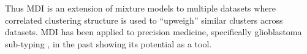 \documentclass[11pt]{article} %
\begin{document}
	Thus MDI is an extension of mixture models to multiple datasets where correlated clustering structure is used to ``upweigh'' similar clusters across datasets. MDI has been applied to precision medicine, specifically glioblastoma sub-typing \cite{savage_identifying_2013}, in the past showing its potential as a tool.
	
%	
%	
\end{document}
